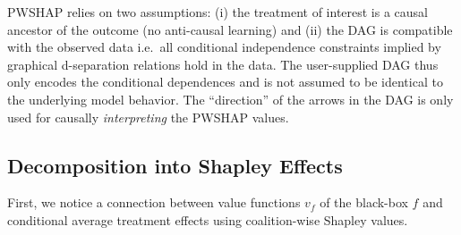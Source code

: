 \documentclass{article}
\theoremstyle{plain}
\theoremstyle{definition}
\theoremstyle{remark}
\theoremstyle{mystyle}
\begin{document}
PWSHAP relies on two assumptions: (i) the treatment of interest is a causal ancestor of the outcome (no anti-causal learning) and (ii) the DAG is compatible with the observed data i.e.\ all conditional independence constraints implied by graphical d-separation relations hold in the data. The user-supplied DAG thus only encodes the conditional dependences and is not assumed to be identical to the underlying model behavior. The ``direction'' of the arrows in the DAG is only used for causally \emph{interpreting} the PWSHAP values.

\subsection{Decomposition into Shapley Effects}
\label{sec:shapley_decomposition}
First, we notice a connection between value functions $v_f$ of the black-box $f$ and conditional average treatment effects using coalition-wise Shapley values.
\end{document}
